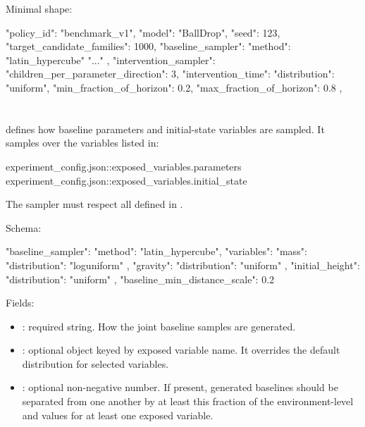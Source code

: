 \documentclass[11pt]{article}
\begin{document}
Minimal shape:

\begin{DocCode}
{
  "policy_id": "benchmark_v1",
  "model": "BallDrop",
  "seed": 123,
  "target_candidate_families": 1000,
   "baseline_sampler": {
    "method": "latin_hypercube"
    "..."
  },
  "intervention_sampler": {
    "children_per_parameter_direction": 3,
    "intervention_time": {
      "distribution": "uniform",
      "min_fraction_of_horizon": 0.2,
      "max_fraction_of_horizon": 0.8
    },
  }
}
\end{DocCode}



\section*{}

 defines how baseline parameters and initial-state variables are sampled.
It samples over the variables listed in:

\begin{DocCode}
experiment_config.json::exposed_variables.parameters
experiment_config.json::exposed_variables.initial_state
\end{DocCode}

The sampler must respect all  defined in .

Schema:

\begin{DocCode}
"baseline_sampler": {
  "method": "latin_hypercube",
  "variables": {
    "mass": {
      "distribution": "loguniform"
    },
    "gravity": {
      "distribution": "uniform"
    },
    "initial_height": {
      "distribution": "uniform"
    }
  },
  "baseline_min_distance_scale": 0.2
}
\end{DocCode}

Fields:

\begin{itemize}
    \item {}: required string. How the joint baseline samples are generated.
    \item {}: optional object keyed by exposed variable name. It overrides the default distribution for selected variables.
    \item {}: optional non-negative number. If present, generated baselines should be separated from one another by at least this fraction of the environment-level \termMinAbsDist{} and \termMinSRDDistance{} values for at least one exposed variable.
\end{itemize}
\end{document}
